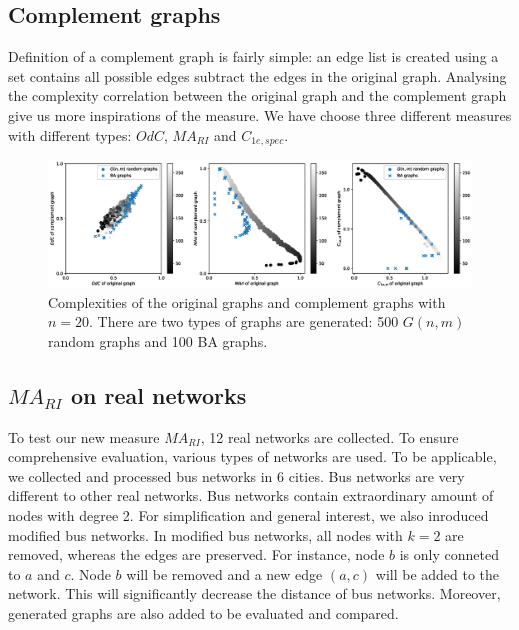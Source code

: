 \documentclass[12pt]{article}
\begin{document}
\subsection{Complement graphs}
Definition of a complement graph is fairly simple: an edge list is created using a set contains all possible edges subtract the edges in the original graph. Analysing the complexity correlation between the original graph and the complement graph give us more inspirations of the measure. We have choose three different measures with different types: $OdC$, $MA_{RI}$ and $C_{1e,spec}$.
\begin{figure}[ht]
    \centering
    \label{fig:complement}
    \includegraphics[width = \textwidth]{complement.eps}
    \caption{Complexities of the original graphs and complement graphs with $n=20$. There are two types of graphs are generated: 500 $G(n,m)$ random graphs and 100 BA graphs.}
\end{figure}

\subsection{$MA_{RI}$ on real networks}
To test our new measure $MA_{RI}$, 12 real networks are collected. To ensure comprehensive evaluation, various types of networks are used. To be applicable, we collected and processed bus networks in 6 cities. Bus networks are very different to other real networks. Bus networks contain extraordinary amount of nodes with degree 2. For simplification and general interest, we also inroduced modified bus networks. In modified bus networks, all nodes with $k=2$ are removed, whereas the edges are preserved. For instance, node $b$ is only conneted to $a$ and $c$. Node $b$ will be removed and a new edge $(a,c)$ will be added to the network. This will significantly decrease the distance of bus networks. Moreover, generated graphs are also added to be evaluated and compared.\\
\end{document}
